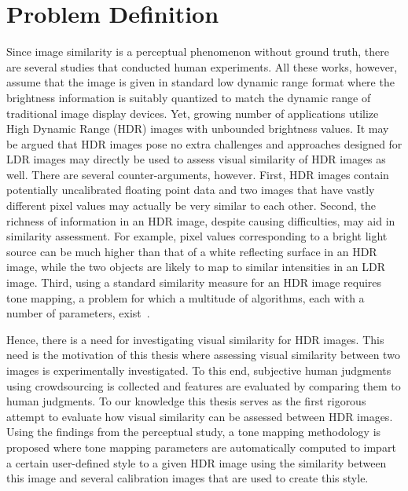 \section{ Problem Definition}
Since image similarity is a perceptual phenomenon without ground truth, there are several studies that conducted human experiments. All these works, however, assume that the image is given in standard low dynamic range format where the brightness information is suitably quantized to match the dynamic range of traditional image display devices. Yet, growing number of applications utilize High Dynamic Range (HDR) images with unbounded brightness values. It may be argued that HDR images pose no extra challenges and approaches designed for LDR images may directly be used to assess visual similarity of HDR images as well. There are several counter-arguments, however. First, HDR images contain potentially uncalibrated floating point data and two images that have vastly different pixel values may actually be very similar to each other. Second, the richness of information in an HDR image, despite causing difficulties, may aid in similarity assessment. For example, pixel values corresponding to a bright light source can be much higher than that of a white reflecting surface in an HDR image, while the two objects are likely to map to similar intensities in an LDR image. Third, using a standard similarity measure for an HDR image requires tone mapping, a problem for which a multitude of algorithms, each with a number of parameters, exist~\cite{yeganeh2012objective}.

Hence, there is a need for investigating visual similarity for HDR images. This need is the motivation of this thesis where assessing visual similarity between two images is experimentally investigated. To this end, subjective human judgments using crowdsourcing is collected and features are evaluated by comparing them to human judgments. To our knowledge this thesis serves as the first rigorous attempt to evaluate how visual similarity can be assessed between HDR images. Using the findings from the perceptual study, a tone mapping methodology is proposed where tone mapping parameters are automatically computed to impart a certain user-defined style to a given HDR image using the similarity between this image and several calibration images that are used to create this style.

